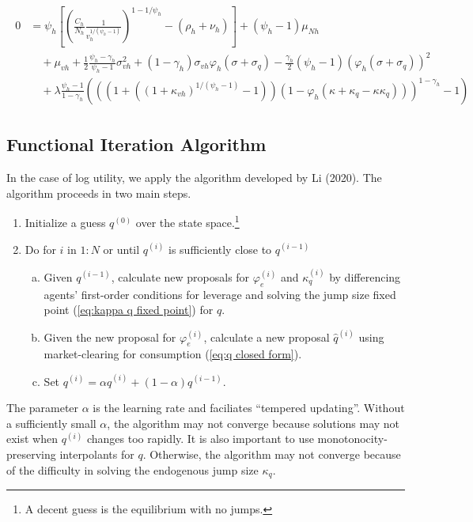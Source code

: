 \documentclass[12 pt, oneside]{article}
\theoremstyle{definition}
\theoremstyle{definition}
\theoremstyle{definition}
\begin{document}
\begin{align}
\begin{split}
  \end{split}\\
  \begin{split}
   0 & = \psi_h\left[\left(\frac{C_h}{N_h}\frac{1}{v_h^{1 / (\psi_h - 1)}}  \right)^{1 - 1 / \psi_h} - (\rho_h + \nu_h)\right]+  (\psi_h - 1)\mu_{Nh}\\
& \quad+ \mu_{vh} + \frac{1}{2}\frac{\psi_h - \gamma_h}{\psi_h - 1}\sigma_{vh}^2   + (1 - \gamma_h)\sigma_{vh}\varphi_h(\sigma + \sigma_q) - \frac{\gamma_h}{2}(\psi_h - 1) (\varphi_h(\sigma + \sigma_q))^2  \\
&\quad + \lambda\frac{\psi_h - 1}{1 - \gamma_h}(((1 +  ((1 + \kappa_{vh})^{1 / (\psi_h - 1)} - 1))(1 - \varphi_h(\kappa + \kappa_q - \kappa\kappa_q)))^{1 - \gamma_h} - 1)
  \end{split}
\end{align}


\subsection{Functional Iteration Algorithm}
In the case of log utility, we apply the algorithm developed by Li (2020). The algorithm proceeds in two main steps.
\begin{enumerate}
\item Initialize a guess $q^{(0)}$ over the state space.\footnote{A decent guess is the equilibrium with no jumps.}
\item Do for $i$ in $1:N$ or until $q^{(i)}$ is sufficiently close to $q^{(i - 1)}$
  \begin{enumerate}[(a)]
  \item Given $q^{(i - 1)}$, calculate new proposals for $\varphi_e^{(i)}$ and $\kappa_q^{(i)}$ by differencing agents' first-order conditions for leverage and solving the jump size fixed point (\ref{eq:kappa q fixed point}) for $q$.
  \item Given the new proposal for $\varphi_e^{(i)}$, calculate a new proposal $\hat{q}^{(i)}$ using market-clearing for consumption (\ref{eq:q closed form}).
  \item Set $q^{(i)} = \alpha \hat{q}^{(i)} + (1 - \alpha) q^{(i - 1)}$.
  \end{enumerate}
\end{enumerate}
The parameter $\alpha$ is the learning rate and faciliates ``tempered updating''. Without a sufficiently small $\alpha$, the algorithm may not converge because solutions may not exist when $q^{(i)}$ changes too rapidly. It is also important to use monotonocity-preserving interpolants for $q$. Otherwise, the algorithm may not converge because of the difficulty in solving the endogenous jump size $\kappa_q$.
\end{document}
